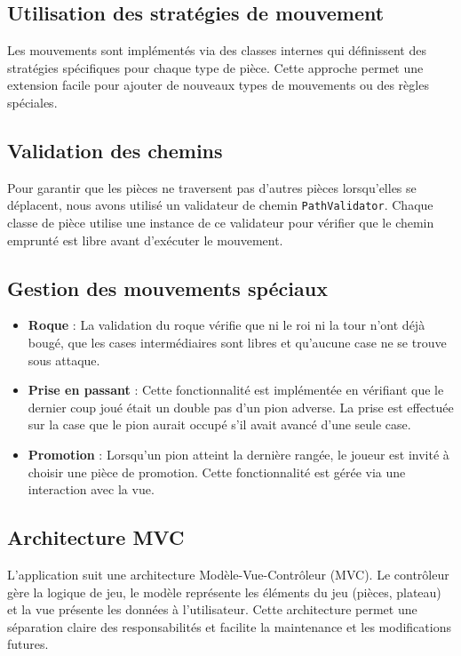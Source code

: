 \documentclass[12pt]{report}
\begin{document}
    \subsection*{Utilisation des stratégies de mouvement}
    Les mouvements sont implémentés via des classes internes qui définissent des stratégies spécifiques pour chaque type de pièce. Cette approche permet une extension facile pour ajouter de nouveaux types de mouvements ou des règles spéciales.

    \subsection*{Validation des chemins}
    Pour garantir que les pièces ne traversent pas d'autres pièces lorsqu'elles se déplacent, nous avons utilisé un validateur de chemin \texttt{PathValidator}. Chaque classe de pièce utilise une instance de ce validateur pour vérifier que le chemin emprunté est libre avant d'exécuter le mouvement.

    \subsection*{Gestion des mouvements spéciaux}
    \begin{itemize}
        \item \textbf{Roque} : La validation du roque vérifie que ni le roi ni la tour n'ont déjà bougé, que les cases intermédiaires sont libres et qu'aucune case ne se trouve sous attaque.
        \item \textbf{Prise en passant} : Cette fonctionnalité est implémentée en vérifiant que le dernier coup joué était un double pas d'un pion adverse. La prise est effectuée sur la case que le pion aurait occupé s'il avait avancé d'une seule case.
        \item \textbf{Promotion} : Lorsqu'un pion atteint la dernière rangée, le joueur est invité à choisir une pièce de promotion. Cette fonctionnalité est gérée via une interaction avec la vue.
    \end{itemize}

    \subsection*{Architecture MVC}
    L'application suit une architecture Modèle-Vue-Contrôleur (MVC). Le contrôleur gère la logique de jeu, le modèle représente les éléments du jeu (pièces, plateau) et la vue présente les données à l'utilisateur. Cette architecture permet une séparation claire des responsabilités et facilite la maintenance et les modifications futures.
\end{document}
